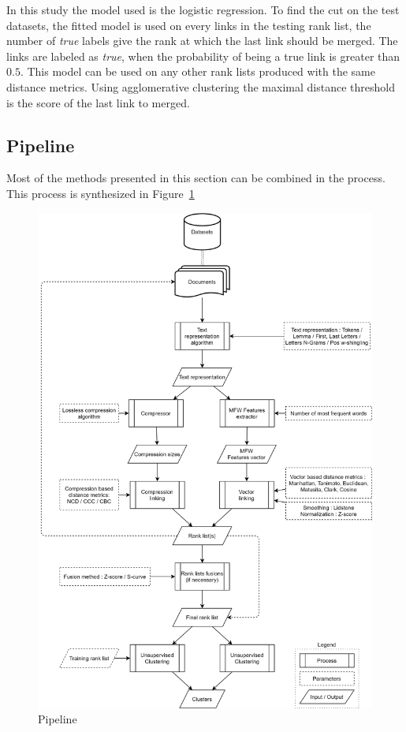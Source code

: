 In this study the model used is the logistic regression.
To find the cut on the test datasets, the fitted model is used on every links in the testing rank list, the number of \textit{true} labels give the rank at which the last link should be merged.
The links are labeled as \textit{true}, when the probability of being a true link is greater than $0.5$.
This model can be used on any other rank lists produced with the same distance metrics.
Using agglomerative clustering the maximal distance threshold is the score of the last link to merged.

\subsection{Pipeline}

Most of the methods presented in this section can be combined in the process. This process is synthesized in Figure~\ref{fig:pipeline}

\onecolumn
\begin{figure}[p]
  \centering
  \caption{Pipeline}
  \label{fig:pipeline}
  \includegraphics[width=\textwidth,height=\textheight,keepaspectratio]{img/pipeline.png}
\end{figure}
\twocolumn

